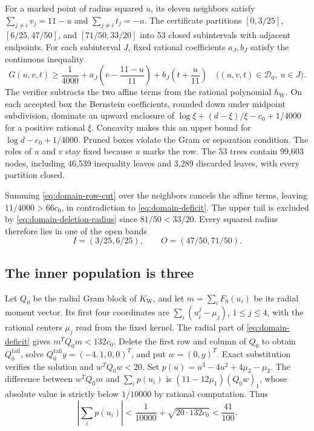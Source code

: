 \documentclass[11pt,letterpaper]{article}
\theoremstyle{remark}
\begin{document}
For a marked point of radius squared \(u\), its eleven neighbors satisfy
\(\sum_{j\ne i}v_j=11-u\) and \(\sum_{j\ne i}t_j=-u\). The certificate
partitions \([0,3/25]\), \([6/25,47/50]\), and \([71/50,33/20]\) into
53 closed subintervals with adjacent endpoints. For each subinterval
\(J\), fixed rational coefficients \(a_J,b_J\) satisfy the continuous
inequality
\begin{equation}
 G(u,v,t)\ge\frac1{4000}
 +a_J\left(v-\frac{11-u}{11}\right)+b_J\left(t+\frac u{11}\right)
 \quad\bigl((u,v,t)\in\mathcal D_0,\ u\in J\bigr).
 \label{eq:domain-row-cut}
\end{equation}
The verifier subtracts the two affine terms from the rational polynomial
\(h_{\mathrm W}\). On each accepted box the Bernstein coefficients,
rounded down under midpoint subdivision, dominate an upward enclosure of
\(\log\xi+(d-\xi)/\xi-c_0+1/4000\) for a positive rational \(\xi\).
Concavity makes this an upper bound for \(\log d-c_0+1/4000\).
Pruned boxes violate
the Gram or separation condition. The roles of \(u\) and \(v\) stay
fixed because \(u\) marks the row. The 53 trees contain 99,603 nodes,
including 46,539 inequality leaves and 3,289 discarded leaves, with
every partition closed.

Summing \eqref{eq:domain-row-cut} over the neighbors cancels the affine
terms, leaving \(11/4000>66c_0\), in contradiction to
\eqref{eq:domain-deficit}. The upper tail is excluded by
\eqref{eq:domain-deletion-radius} since \(81/50<33/20\). Every squared
radius therefore lies in one of the open bands
\[
 I=(3/25,6/25),\qquad O=(47/50,71/50).
\]

\subsection{The inner population is three}

Let \(Q_0\) be the radial Gram block of \(K_{\mathrm W}\), and let
\(m=\sum_i F_0(u_i)\) be its radial moment vector. Its first four
coordinates are \(\sum_i(u_i^j-\mu_j)\), \(1\le j\le4\), with the
rational centers \(\mu_j\) read from the fixed kernel. The radial part
of \eqref{eq:domain-deficit} gives \(m^TQ_0m<132c_0\). Delete the first
row and column of \(Q_0\) to obtain \(Q_0^{\mathrm{tail}}\), solve
\(Q_0^{\mathrm{tail}}y=(-4,1,0,0)^T\), and put \(w=(0,y)^T\).
Exact substitution verifies the solution and \(w^TQ_0w<20\). Set
\(p(u)=u^3-4u^2+4\mu_2-\mu_3\). The difference between \(w^TQ_0m\)
and \(\sum_i p(u_i)\) is \((11-12\mu_1)(Q_0w)_1\), whose absolute
value is strictly below \(1/10000\) by rational computation. Thus
\[
 \left|\sum_i p(u_i)\right|
 <\frac1{10000}+\sqrt{20\cdot132c_0}<\frac{41}{100}.
\]
\end{document}
